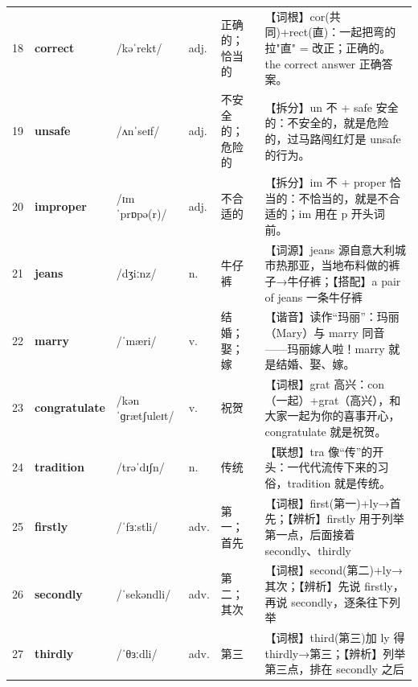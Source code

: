 \documentclass[UTF8,a4paper,11pt,oneside]{ctexbook}
\newcommand{\cellword}[1]{{\bfseries\textcolor{wordcol}{#1}}}
\newcommand{\cellipa}[1]{{\footnotesize\textcolor{ipacol}{#1}}}
\newcommand{\cellpos}[1]{\textcolor{poscol}{#1}}
\newcommand{\cellno}[1]{\textcolor{volcolor!75!black}{#1}}
\begin{document}
{\begin{longtable}{@{}C{0.045\textwidth}L{0.155\textwidth}L{0.175\textwidth}C{0.070\textwidth}L{0.180\textwidth}L{0.282\textwidth}@{}}
\cellno{18} & \cellword{correct} & \cellipa{/kəˈrekt/} & \cellpos{adj.} & 正确的；恰当的 & \textcolor{tagRoot}{【词根】}cor(共同)+rect(直)：一起把弯的拉"直" = 改正；正确的。the correct answer 正确答案。 \\
 \cellno{19} & \cellword{unsafe} & \cellipa{/ʌnˈseɪf/} & \cellpos{adj.} & 不安全的；危险的 & \textcolor{tagSplit}{【拆分】}un 不 + safe 安全的：不安全的，就是危险的，过马路闯红灯是 unsafe 的行为。 \\
\cellno{20} & \cellword{improper} & \cellipa{/ɪmˈprɒpə(r)/} & \cellpos{adj.} & 不合适的 & \textcolor{tagSplit}{【拆分】}im 不 + proper 恰当的：不恰当的，就是不合适的；im 用在 p 开头词前。 \\
 \cellno{21} & \cellword{jeans} & \cellipa{/dʒiːnz/} & \cellpos{n.} & 牛仔裤 & \textcolor{tagEtym}{【词源】}jeans 源自意大利城市热那亚，当地布料做的裤子→\allowbreak{}牛仔裤；\textcolor{tagColloc}{【搭配】}a pair of jeans 一条牛仔裤 \\
\cellno{22} & \cellword{marry} & \cellipa{/ˈmæri/} & \cellpos{v.} & 结婚；娶；嫁 & \textcolor{tagSound}{【谐音】}读作“玛丽”：玛丽（Mary）与 marry 同音——玛丽嫁人啦！marry 就是结婚、娶、嫁。 \\
 \cellno{23} & \cellword{congratulate} & \cellipa{/kənˈɡrætʃuleɪt/} & \cellpos{v.} & 祝贺 & \textcolor{tagRoot}{【词根】}grat 高兴：con（一起）+grat（高兴），和大家一起为你的喜事开心，congratulate 就是祝贺。 \\
\cellno{24} & \cellword{tradition} & \cellipa{/trəˈdɪʃn/} & \cellpos{n.} & 传统 & \textcolor{tagAssoc}{【联想】}tra 像“传”的开头：一代代流传下来的习俗，tradition 就是传统。 \\
 \cellno{25} & \cellword{firstly} & \cellipa{/ˈfɜːstli/} & \cellpos{adv.} & 第一；首先 & \textcolor{tagRoot}{【词根】}first(第一)+ly→\allowbreak{}首先；\textcolor{tagDist}{【辨析】}firstly 用于列举第一点，后面接着 secondly、thirdly \\
\cellno{26} & \cellword{secondly} & \cellipa{/ˈsekəndli/} & \cellpos{adv.} & 第二；其次 & \textcolor{tagRoot}{【词根】}second(第二)+ly→\allowbreak{}其次；\textcolor{tagDist}{【辨析】}先说 firstly，再说 secondly，逐条往下列举 \\
 \cellno{27} & \cellword{thirdly} & \cellipa{/ˈθɜːdli/} & \cellpos{adv.} & 第三 & \textcolor{tagRoot}{【词根】}third(第三)加 ly 得 thirdly→\allowbreak{}第三；\textcolor{tagDist}{【辨析】}列举第三点，排在 secondly 之后 \\

\end{longtable}}
\end{document}
